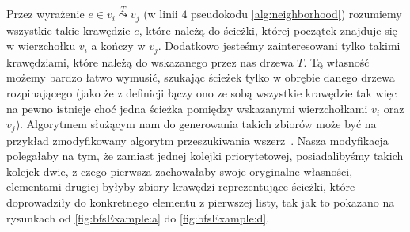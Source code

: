 Przez wyrażenie $e \in v_{i} \overset{T}{\leadsto} v_{j}$ (w linii $4$ pseudokodu \ref{alg:neighborhood}) rozumiemy wszystkie takie krawędzie $e$, które należą do ścieżki, której początek znajduje się w wierzchołku $v_{i}$ a kończy w $v_{j}$. Dodatkowo jesteśmy zainteresowani tylko takimi krawędziami, które należą do wskazanego przez nas drzewa $T$. Tą własność możemy bardzo łatwo wymusić, szukając ścieżek tylko w obrębie danego drzewa rozpinającego (jako że z definicji łączy ono ze sobą wszystkie krawędzie tak więc na pewno istnieje choć jedna ścieżka pomiędzy wskazanymi wierzchołkami $v_{i}$ oraz $v_{j}$). Algorytmem służącym nam do generowania takich zbiorów może być na przykład zmodyfikowany algorytm przeszukiwania wszerz~\cite[$604$--$606$]{Cormen}. Nasza modyfikacja polegałaby na tym, że zamiast jednej kolejki priorytetowej, posiadalibyśmy takich kolejek dwie, z czego pierwsza zachowałaby swoje oryginalne własności, elementami drugiej byłyby zbiory krawędzi reprezentujące ścieżki, które doprowadziły do konkretnego elementu z pierwszej listy, tak jak to pokazano na rysunkach od \ref{fig:bfsExample:a} do \ref{fig:bfsExample:d}.


